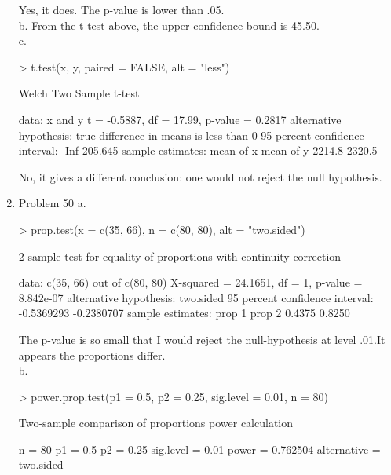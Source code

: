 \documentclass[11pt,letterpaper]{article}
\begin{document}
\begin{enumerate}
Yes, it does. The p-value is lower than .05.\\

b. From the t-test above, the upper confidence bound is 45.50.\\

c.
\begin{Schunk}
\begin{Sinput}
> t.test(x, y, paired = FALSE, alt = "less")
\end{Sinput}
\begin{Soutput}
	Welch Two Sample t-test

data:  x and y 
t = -0.5887, df = 17.99, p-value = 0.2817
alternative hypothesis: true difference in means is less than 0 
95 percent confidence interval:
    -Inf 205.645 
sample estimates:
mean of x mean of y 
   2214.8    2320.5 
\end{Soutput}
\end{Schunk}
No, it gives a different conclusion: one would not reject the null hypothesis.

\item Problem 50
a.
\begin{Schunk}
\begin{Sinput}
> prop.test(x = c(35, 66), n = c(80, 80), alt = "two.sided")
\end{Sinput}
\begin{Soutput}
	2-sample test for equality of proportions with continuity correction

data:  c(35, 66) out of c(80, 80) 
X-squared = 24.1651, df = 1, p-value = 8.842e-07
alternative hypothesis: two.sided 
95 percent confidence interval:
 -0.5369293 -0.2380707 
sample estimates:
prop 1 prop 2 
0.4375 0.8250 
\end{Soutput}
\end{Schunk}
The p-value is so small that I would reject the null-hypothesis at level .01.It appears the proportions differ.\\

b.
\begin{Schunk}
\begin{Sinput}
> power.prop.test(p1 = 0.5, p2 = 0.25, sig.level = 0.01, n = 80)
\end{Sinput}
\begin{Soutput}
     Two-sample comparison of proportions power calculation 

              n = 80
             p1 = 0.5
             p2 = 0.25
      sig.level = 0.01
          power = 0.762504
    alternative = two.sided


\end{Soutput}
\end{Schunk}
\end{enumerate}
\end{document}
